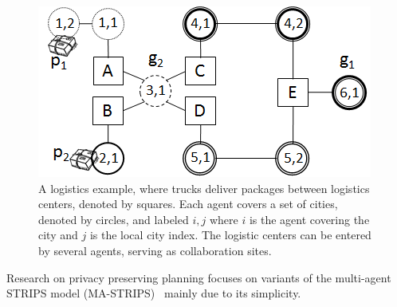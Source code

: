 \documentclass[letterpaper]{article}
\theoremstyle{definition}
\begin{document}
\begin{figure}
\centering
\includegraphics[width=\columnwidth]{Logistics}
\caption{A logistics example, where trucks deliver packages between logistics centers, denoted by squares. Each agent covers a set of cities, denoted by circles, and labeled $i,j$ where $i$ is the agent covering the city and $j$ is the local city index. The logistic centers can be entered by several agents, serving as collaboration sites.}
\label{fig:logistics}
\end{figure}


Research on privacy preserving planning focuses on variants of the multi-agent STRIPS model (MA-STRIPS)~\cite{brafman2013complexity} mainly due to its simplicity.


\end{document}
